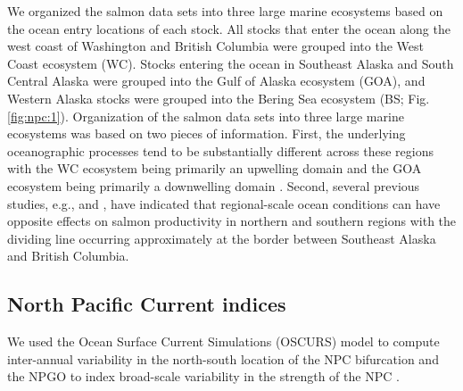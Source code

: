 We organized the salmon data sets into three large marine ecosystems based on
the ocean entry locations of each stock. All stocks that enter the ocean along
the west coast of Washington and British Columbia were grouped into the West
Coast ecosystem (WC). Stocks entering the ocean in Southeast Alaska and South
Central Alaska were grouped into the Gulf of Alaska ecosystem (GOA), and Western
Alaska stocks were grouped into the Bering Sea ecosystem (BS; Fig.
\ref{fig:npc:1}). Organization of the salmon data sets into three large marine
ecosystems was based on two pieces of information. First, the underlying
oceanographic processes tend to be substantially different across these regions
with the WC ecosystem being primarily an upwelling domain and the GOA ecosystem
being primarily a downwelling domain \citep{Ware1989a}. Second, several previous
studies, e.g., \citet{Malick2015a} and \citet{Mueter2002a}, have indicated that
regional-scale ocean conditions can have opposite effects on salmon productivity
in northern and southern regions with the dividing line occurring approximately
at the border between Southeast Alaska and British Columbia.


\subsection{North Pacific Current indices}

We used the Ocean Surface Current Simulations (OSCURS) model to compute
inter-annual variability in the north-south location of the NPC bifurcation
\citep{Ingraham1997a} and the NPGO to index broad-scale variability in the
strength of the NPC \citep{Di-Lorenzo2008a}.

